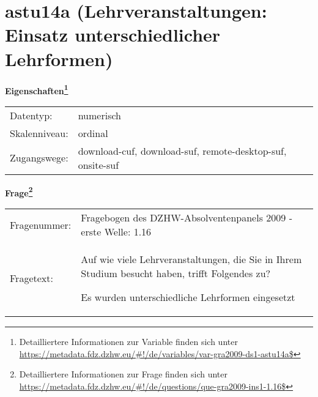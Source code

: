 
    \setcounter{footnote}{0}

    \vspace*{-1.8cm}
	\section{astu14a (Lehrveranstaltungen: Einsatz unterschiedlicher Lehrformen)}
	\label{section:astu14a}



    \vspace*{0.5cm}
    \noindent\textbf{Eigenschaften\footnote{Detailliertere Informationen zur Variable finden sich unter
		\url{https://metadata.fdz.dzhw.eu/\#!/de/variables/var-gra2009-ds1-astu14a$}}}\\
	\begin{tabularx}{\hsize}{@{}lX}
	Datentyp: & numerisch \\
	Skalenniveau: & ordinal \\
	Zugangswege: &
	  download-cuf, 
	  download-suf, 
	  remote-desktop-suf, 
	  onsite-suf
 \\
    \end{tabularx}



				\vspace*{0.5cm}
                \noindent\textbf{Frage\footnote{Detailliertere Informationen zur Frage finden sich unter
		              \url{https://metadata.fdz.dzhw.eu/\#!/de/questions/que-gra2009-ins1-1.16$}}}\\
				\begin{tabularx}{\hsize}{@{}lX}
					Fragenummer: &
					  Fragebogen des DZHW-Absolventenpanels 2009 - erste Welle:
					  1.16
 \\
					Fragetext: & Auf wie viele Lehrveranstaltungen, die Sie in Ihrem Studium besucht haben, trifft Folgendes zu?\par  Es wurden unterschiedliche Lehrformen eingesetzt \\
				\end{tabularx}





